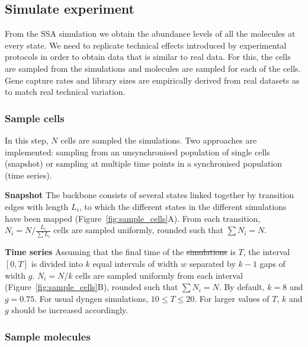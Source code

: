 \documentclass[
  table,
  10pt,
  a4paper]{article}
\providecommand{\DIFaddtex}[1]{{\protect\color{blue}\uwave{#1}}} %
\providecommand{\DIFdeltex}[1]{{\protect\color{red}\sout{#1}}}                      %
\providecommand{\DIFaddbegin}{} %
\providecommand{\DIFaddend}{} %
\providecommand{\DIFdelbegin}{} %
\providecommand{\DIFdelend}{} %
\providecommand{\DIFadd}[1]{\texorpdfstring{\DIFaddtex{#1}}{#1}} %
\providecommand{\DIFdel}[1]{\texorpdfstring{\DIFdeltex{#1}}{}} %
\newcommand{\DIFscaledelfig}{0.5}
\newlength{\DIFdelgraphicswidth} %
\newlength{\DIFdelgraphicsheight} %
\newcommand{\DIFaddincludegraphics}[2][]{{\color{blue}\fbox{\DIFOincludegraphics[#1]{#2}}}} %
\newcommand{\DIFdelincludegraphics}[2][]{%
\sbox{\DIFdelgraphicsbox}{\DIFOincludegraphics[#1]{#2}}%
\settoboxwidth{\DIFdelgraphicswidth}{\DIFdelgraphicsbox} %
\settoboxtotalheight{\DIFdelgraphicsheight}{\DIFdelgraphicsbox} %
\scalebox{\DIFscaledelfig}{%
\parbox[b]{\DIFdelgraphicswidth}{\usebox{\DIFdelgraphicsbox}\\[-\baselineskip] \rule{\DIFdelgraphicswidth}{0em}}\llap{\resizebox{\DIFdelgraphicswidth}{\DIFdelgraphicsheight}{%
\setlength{\unitlength}{\DIFdelgraphicswidth}%
\begin{picture}(1,1)%
\thicklines\linethickness{2pt} %
{\color[rgb]{1,0,0}\put(0,0){\framebox(1,1){}}}%
{\color[rgb]{1,0,0}\put(0,0){\line( 1,1){1}}}%
{\color[rgb]{1,0,0}\put(0,1){\line(1,-1){1}}}%
\end{picture}%
}\hspace*{3pt}}} %
} %
\DeclareRobustCommand{\DIFaddbegin}{\DIFOaddbegin \let\includegraphics\DIFaddincludegraphics} %
\DeclareRobustCommand{\DIFaddend}{\DIFOaddend \let\includegraphics\DIFOincludegraphics} %
\DeclareRobustCommand{\DIFdelbegin}{\DIFOdelbegin \let\includegraphics\DIFdelincludegraphics} %
\DeclareRobustCommand{\DIFdelend}{\DIFOaddend \let\includegraphics\DIFOincludegraphics} %
\begin{document}
\hypertarget{sec:dyngen-experiment}{%
\subsection{Simulate experiment}\label{sec:dyngen-experiment}}

From the SSA simulation we obtain the abundance levels of all the
molecules at every state. We need to replicate technical effects
introduced by experimental protocols in order to obtain data that is
similar to real data. For this, the cells are sampled from the
simulations and molecules are sampled for each of the cells. Gene
capture rates and library sizes are empirically derived from real
datasets as to match real technical variation.

\hypertarget{sample-cells}{%
\subsubsection{Sample cells}\label{sample-cells}}

In this step, \(N\) cells are sampled \DIFaddbegin \DIFadd{from }\DIFaddend the simulations. Two
approaches are implemented: sampling from an unsynchronised population
of single cells (snapshot) or sampling at multiple time points in a
synchronised population (time series).

\textbf{Snapshot} The backbone consists of several states linked
together by transition edges with length \(L_i\), to which the different
states in the different simulations have been mapped
(Figure~\ref{fig:sample_cells}A). From each transition,
\(N_i = N / \frac{L_i}{\sum L_i}\) cells are sampled uniformly, rounded
such that \(\sum N_i = N\).

\textbf{Time series} Assuming that the final time of the \DIFdelbegin \DIFdel{simulations }\DIFdelend \DIFaddbegin \DIFadd{simulation }\DIFaddend is
\(T\), the interval \([0, T]\) is divided into \(k\) equal intervals of
width \(w\) separated by \(k-1\) gaps of width \(g\). \(N_i = N / k\)
cells are sampled uniformly from each interval
(Figure~\ref{fig:sample_cells}B), rounded such that \(\sum N_i = N\). By
default, \(k = 8\) and \(g = 0.75\). For usual dyngen simulations,
\(10 \leq T \leq 20\). For larger values of \(T\), \(k\) and \(g\)
should be increased accordingly.

\hypertarget{sample-molecules}{%
\subsubsection{Sample molecules}\label{sample-molecules}}
\end{document}
